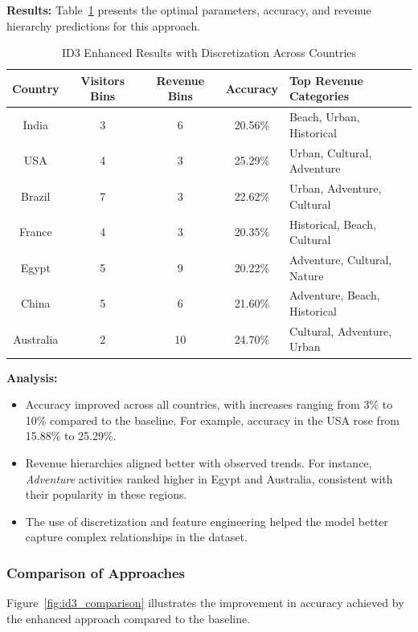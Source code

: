 \documentclass{article}
\begin{document}
\textbf{Results:} Table~\ref{tab:id3_discretization_results} presents the optimal parameters, accuracy, and revenue hierarchy predictions for this approach.

\begin{table}[h!]
    \centering
    \begin{tabular}{|c|c|c|c|l|}
        \hline
        \textbf{Country} & \textbf{Visitors Bins} & \textbf{Revenue Bins} & \textbf{Accuracy} & \textbf{Top Revenue Categories} \\ \hline
        India & 3 & 6 & 20.56\% & Beach, Urban, Historical \\ 
        USA & 4 & 3 & 25.29\% & Urban, Cultural, Adventure \\ 
        Brazil & 7 & 3 & 22.62\% & Urban, Adventure, Cultural \\ 
        France & 4 & 3 & 20.35\% & Historical, Beach, Cultural \\ 
        Egypt & 5 & 9 & 20.22\% & Adventure, Cultural, Nature \\ 
        China & 5 & 6 & 21.60\% & Adventure, Beach, Historical \\ 
        Australia & 2 & 10 & 24.70\% & Cultural, Adventure, Urban \\ \hline
    \end{tabular}
    \caption{ID3 Enhanced Results with Discretization Across Countries}
    \label{tab:id3_discretization_results}
\end{table}

\textbf{Analysis:}
\begin{itemize}
    \item Accuracy improved across all countries, with increases ranging from 3\% to 10\% compared to the baseline. For example, accuracy in the USA rose from 15.88\% to 25.29\%.
    \item Revenue hierarchies aligned better with observed trends. For instance, \textit{Adventure} activities ranked higher in Egypt and Australia, consistent with their popularity in these regions.
    \item The use of discretization and feature engineering helped the model better capture complex relationships in the dataset.
\end{itemize}

\subsubsection{Comparison of Approaches}
Figure~\ref{fig:id3_comparison} illustrates the improvement in accuracy achieved by the enhanced approach compared to the baseline.
\end{document}
